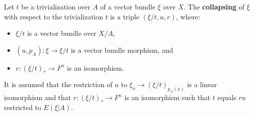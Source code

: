 Let $t$ be a trivialization over $A$ of a vector bundle $\xi$ over $X$. The \textbf{collapsing} of $\xi$ with respect to the trivialization $t$ is a triple $(\xi/t, u, r)$, where:
\begin{itemize}
  \item $\xi/t$ is a vector bundle over $X/A$,
  \item $(u, p_A): \xi \rightarrow \xi/t$ is a vector bundle morphism, and
  \item $r: (\xi/t)_* \rightarrow F^n$ is an isomorphism.
\end{itemize}
It is assumed that the restriction of $u$ to $\xi_x \rightarrow (\xi/t)_{p_A(x)}$ is a linear isomorphism and that $r: (\xi/t)_* \rightarrow F^n$ is an isomorphism such that $t$ equals $ru$ restricted to $E(\xi|A)$.

